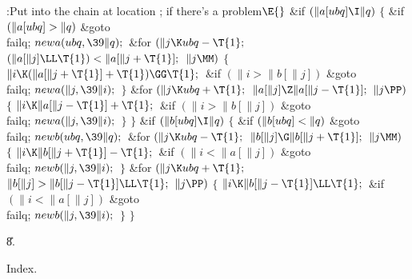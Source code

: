 \Y\B\4:Put  into the chain at location ;  if there's a problem\X${}\E{}$\6
\&{if} ${}(\|a[\\{ubq}]\I\|q){}$\5
${}\{{}$\1\6
\&{if} ${}(\|a[\\{ubq}]>\|q){}$\1\5
\&{goto} \\{failq};\2\6
${}\\{newa}(\\{ubq},\39\|q);{}$\6
\&{for} ${}(\|j\K\\{ubq}-\T{1};{}$ ${}(\|a[\|j]\LL\T{1})<\|a[\|j+\T{1}];{}$ ${}%
\|j\MM){}$\5
${}\{{}$\1\6
${}\|i\K(\|a[\|j+\T{1}]+\T{1})\GG\T{1};{}$\6
\&{if} ${}(\|i>\|b[\|j]){}$\1\5
\&{goto} \\{failq};\2\6
${}\\{newa}(\|j,\39\|i);{}$\6
\4${}\}{}$\2\6
\&{for} ${}(\|j\K\\{ubq}+\T{1};{}$ ${}\|a[\|j]\Z\|a[\|j-\T{1}];{}$ ${}\|j%
\PP){}$\5
${}\{{}$\1\6
${}\|i\K\|a[\|j-\T{1}]+\T{1};{}$\6
\&{if} ${}(\|i>\|b[\|j]){}$\1\5
\&{goto} \\{failq};\2\6
${}\\{newa}(\|j,\39\|i);{}$\6
\4${}\}{}$\2\6
\4${}\}{}$\2\6
\&{if} ${}(\|b[\\{ubq}]\I\|q){}$\5
${}\{{}$\1\6
\&{if} ${}(\|b[\\{ubq}]<\|q){}$\1\5
\&{goto} \\{failq};\2\6
${}\\{newb}(\\{ubq},\39\|q);{}$\6
\&{for} ${}(\|j\K\\{ubq}-\T{1};{}$ ${}\|b[\|j]\G\|b[\|j+\T{1}];{}$ ${}\|j%
\MM){}$\5
${}\{{}$\1\6
${}\|i\K\|b[\|j+\T{1}]-\T{1};{}$\6
\&{if} ${}(\|i<\|a[\|j]){}$\1\5
\&{goto} \\{failq};\2\6
${}\\{newb}(\|j,\39\|i);{}$\6
\4${}\}{}$\2\6
\&{for} ${}(\|j\K\\{ubq}+\T{1};{}$ ${}\|b[\|j]>\|b[\|j-\T{1}]\LL\T{1};{}$ ${}%
\|j\PP){}$\5
${}\{{}$\1\6
${}\|i\K\|b[\|j-\T{1}]\LL\T{1};{}$\6
\&{if} ${}(\|i<\|a[\|j]){}$\1\5
\&{goto} \\{failq};\2\6
${}\\{newb}(\|j,\39\|i);{}$\6
\4${}\}{}$\2\6
\4${}\}{}$\2\par
\U8.\fi

Index.


\fi


\inx
\fin
\con
